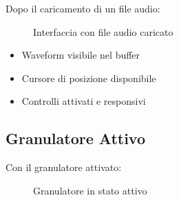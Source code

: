 \documentclass[a4paper,11pt,openany]{book}
\begin{document}
Dopo il caricamento di un file audio:

\begin{figure}[H]
    \centering
    \caption{Interfaccia con file audio caricato}
    \label{fig:interface_loaded}
\end{figure}

\begin{itemize}
    \item Waveform visibile nel buffer
    \item Cursore di posizione disponibile
    \item Controlli attivati e responsivi
\end{itemize}

\subsection{Granulatore Attivo}

Con il granulatore attivato:

\begin{figure}[H]
    \centering
    \caption{Granulatore in stato attivo}
    \label{fig:interface_active}
\end{figure}
\end{document}
